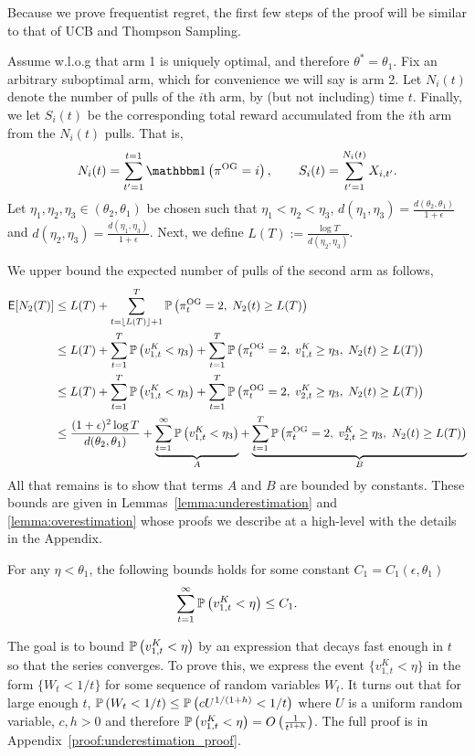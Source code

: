 \begin{myproof}[Proof.]
	Because we prove frequentist regret, the first few steps of the proof will be similar to that of UCB and Thompson Sampling.
	
	Assume w.l.o.g that arm 1 is uniquely optimal, and therefore $\theta^* = \theta_1$. Fix an arbitrary suboptimal arm, which for convenience we will say is arm 2. Let $N_i(t)$ denote the number of pulls of the $i$th arm, by (but not including) time $t$. Finally, we let $S_i(t)$ be the corresponding total reward accumulated from the $i$th arm from the $N_i(t)$ pulls. That is,
	\[
	N_i(t) = \sum_{t'=1}^{t=1} \ind{\pi^{\rm OG} = i}, \qquad S_i(t) = \sum_{t'=1}^{N_i(t)} X_{i,t'}.
	\]
	Let $\eta_1,\eta_2,\eta_3 \in (\theta_2, \theta_1)$ be chosen such that $\eta_1 < \eta_2 < \eta_3$, $d(\eta_1, \eta_3) = \frac{d(\theta_2, \theta_1)}{1+\epsilon}$ and $d(\eta_2,\eta_3) =\frac{d(\eta_1, \eta_3)}{1+\epsilon} $. Next, we define $L(T) := \frac{\log T}{d(\eta_2,\eta_3)}$.
	
	We upper bound the expected number of pulls of the second arm as follows,
	\begin{align}
	\E[N_2(T)] & \le L(T) + \sum_{t=\floor{L(T)}+1}^T \P{\pi^{\rm OG}_t = 2, \; N_2(t) \ge L(T)} \nonumber \\
	& \le L(T) +   \sum_{t=1}^T \P{v^K_{1,t} < \eta_3} + \sum_{t=1}^T \P{\pi^{\rm OG}_t = 2,\; v^K_{1,t} \ge \eta_3, \; N_2(t) \ge L(T)} \nonumber \\
	& \le L(T) +   \sum_{t=1}^T \P{v^K_{1,t} < \eta_3} + \sum_{t=1}^T \P{\pi^{\rm OG}_t = 2,\; v^K_{2,t} \ge \eta_3, \; N_2(t) \ge L(T)} \nonumber \\
	& \le \frac{(1+\epsilon)^2 \log T}{d(\theta_2, \theta_1)} + \underbrace{\sum_{t=1}^\infty \P{v^K_{1,t} < \eta_3}}_{A} + \underbrace{\sum_{t=1}^T \P{\pi^{\rm OG}_t = 2,\;v^K_{2,t} \ge \eta_3, \; N_2(t) \ge L(T)}}_{B} \label{bound:final_step_in_freq_regret}
	\end{align}
	All that remains is to show that terms $A$ and $B$ are bounded by constants. These bounds are given in Lemmas~\ref{lemma:underestimation} and \ref{lemma:overestimation} whose proofs we describe at a high-level with the details in the Appendix.
	\begin{lemma} \label{lemma:underestimation}
		For any $\eta < \theta_1$, the following bounds holds for some constant $C_1 = C_1(\epsilon, \theta_1)$
		\begin{equation*}
		\sum_{t=1}^\infty \P{v^K_{1,t} < \eta} \le C_1.
		\end{equation*}
	\end{lemma}
	\begin{myproof}
		The goal is to bound $\P{v^K_{1,t} < \eta}$ by an expression that decays fast enough in $t$ so that the series converges. To prove this, we express the event $\{v^K_{1,t} < \eta\}$ in the form $\{W_t < 1/t\}$ for some sequence of random variables $W_t$. It  turns out that for large enough $t$, $\P{W_t < 1/t} \le \P{c U^{1/(1+h)} < 1/t}$ where $U$ is a uniform random variable, $c, h > 0$ and therefore $\P{v^K_{1,t} < \eta} = O\left(\frac{1}{t^{1+h}}\right)$. The full proof is in Appendix~\ref{proof:underestimation_proof}.
		

\end{myproof}
\end{myproof}
